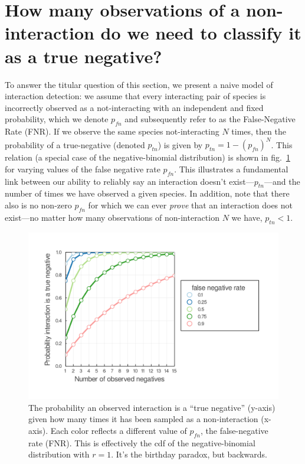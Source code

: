 \documentclass[10pt,oneside]{article}
\makeatletter
\def\maxwidth{\ifdim\Gin@nat@width>\linewidth\linewidth
\else\Gin@nat@width\fi}
\let\Oldincludegraphics\includegraphics
\renewcommand{\includegraphics}[1]{\Oldincludegraphics[width=\maxwidth]{#1}}
\makeatother
\begin{document}
\hypertarget{how-many-observations-of-a-non-interaction-do-we-need-to-classify-it-as-a-true-negative}{%
\section{How many observations of a non-interaction do we need to
classify it as a true
negative?}\label{how-many-observations-of-a-non-interaction-do-we-need-to-classify-it-as-a-true-negative}}

To answer the titular question of this section, we present a naive model
of interaction detection: we assume that every interacting pair of
species is incorrectly observed as a not-interacting with an independent
and fixed probability, which we denote \(p_{fn}\) and subsequently refer
to as the False-Negative Rate (FNR). If we observe the same species
not-interacting \(N\) times, then the probability of a true-negative
(denoted \(p_{tn}\)) is given by \(p_{tn} = 1 - (p_{fn})^N\). This
relation (a special case of the negative-binomial distribution) is shown
in fig.~\ref{fig:negativebinom} for varying values of the false negative
rate \(p_{fn}\). This illustrates a fundamental link between our ability
to reliably say an interaction doesn't exist---\(p_{tn}\)---and the
number of times we have observed a given species. In addition, note that
there also is no non-zero \(p_{fn}\) for which we can ever \emph{prove}
that an interaction does not exist---no matter how many observations of
non-interaction \(N\) we have, \(p_{tn} < 1\).

\begin{figure}
\hypertarget{fig:negativebinom}{%
\centering
\includegraphics{./figures/negativebinomial.png}
\caption{The probability an observed interaction is a ``true negative''
(y-axis) given how many times it has been sampled as a non-interaction
(x-axis). Each color reflects a different value of \(p_{fn}\), the
false-negative rate (FNR). This is effectively the cdf of the
negative-binomial distribution with \(r=1\). It's the birthday paradox,
but backwards.}\label{fig:negativebinom}
}
\end{figure}
\end{document}
